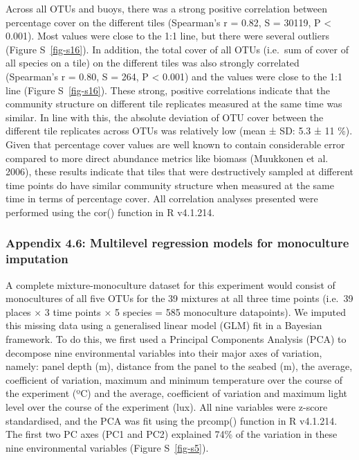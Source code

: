 \documentclass[
  letterpaper,
  DIV=11,
  numbers=noendperiod]{scrartcl}
\begin{document}
Across all OTUs and buoys, there was a strong positive correlation
between percentage cover on the different tiles (Spearman's r = 0.82, S
= 30119, P \textless{} 0.001). Most values were close to the 1:1 line,
but there were several outliers (Figure S~\ref{fig-s16}). In addition,
the total cover of all OTUs (i.e.~sum of cover of all species on a tile)
on the different tiles was also strongly correlated (Spearman's r =
0.80, S = 264, P \textless{} 0.001) and the values were close to the 1:1
line (Figure S~\ref{fig-s16}). These strong, positive correlations
indicate that the community structure on different tile replicates
measured at the same time was similar. In line with this, the absolute
deviation of OTU cover between the different tile replicates across OTUs
was relatively low (mean ± SD: 5.3 ± 11 \%). Given that percentage cover
values are well known to contain considerable error compared to more
direct abundance metrics like biomass (Muukkonen et al. 2006), these
results indicate that tiles that were destructively sampled at different
time points do have similar community structure when measured at the
same time in terms of percentage cover. All correlation analyses
presented were performed using the cor() function in R v4.1.214.

\subsubsection{Appendix 4.6: Multilevel regression models for
monoculture
imputation}\label{appendix-4.6-multilevel-regression-models-for-monoculture-imputation}

A complete mixture-monoculture dataset for this experiment would consist
of monocultures of all five OTUs for the 39 mixtures at all three time
points (i.e.~39 places × 3 time points × 5 species = 585 monoculture
datapoints). We imputed this missing data using a generalised linear
model (GLM) fit in a Bayesian framework. To do this, we first used a
Principal Components Analysis (PCA) to decompose nine environmental
variables into their major axes of variation, namely: panel depth (m),
distance from the panel to the seabed (m), the average, coefficient of
variation, maximum and minimum temperature over the course of the
experiment (ºC) and the average, coefficient of variation and maximum
light level over the course of the experiment (lux). All nine variables
were z-score standardised, and the PCA was fit using the prcomp()
function in R v4.1.214. The first two PC axes (PC1 and PC2) explained
74\% of the variation in these nine environmental variables (Figure
S~\ref{fig-s5}).
\end{document}
